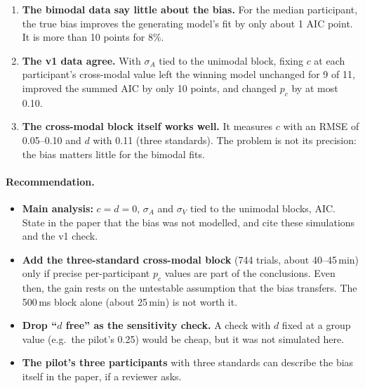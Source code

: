 \documentclass[11pt,a4paper]{article}
\newcommand{\pc}{p_c}
\begin{document}
\begin{enumerate}
\begin{itemize}
  \item If the bias does not transfer, there is no gain: 0.193 with fixed values, 0.176 with priors.
  \end{itemize}
\item \textbf{The bimodal data say little about the bias.} For the median participant, the true bias improves the generating model's fit by only about 1 AIC point. It is more than 10 points for 8\%.
\item \textbf{The v1 data agree.} With $\sigma_A$ tied to the unimodal block, fixing $c$ at each participant's cross-modal value left the winning model unchanged for 9 of 11, improved the summed AIC by only 10 points, and changed $\pc$ by at most 0.10.
\item \textbf{The cross-modal block itself works well.} It measures $c$ with an RMSE of 0.05--0.10 and $d$ with 0.11 (three standards). The problem is not its precision: the bias matters little for the bimodal fits.
\end{enumerate}

\paragraph{Recommendation.}
\begin{itemize}
\item \textbf{Main analysis:} $c = d = 0$, $\sigma_A$ and $\sigma_V$ tied to the unimodal blocks, AIC. State in the paper that the bias was not modelled, and cite these simulations and the v1 check.
\item \textbf{Add the three-standard cross-modal block} (744 trials, about 40--45\,min) only if precise per-participant $\pc$ values are part of the conclusions. Even then, the gain rests on the untestable assumption that the bias transfers. The 500\,ms block alone (about 25\,min) is not worth it.
\item \textbf{Drop ``$d$ free'' as the sensitivity check.} A check with $d$ fixed at a group value (e.g.\ the pilot's 0.25) would be cheap, but it was not simulated here.
\item \textbf{The pilot's three participants} with three standards can describe the bias itself in the paper, if a reviewer asks.
\end{itemize}
\end{document}
